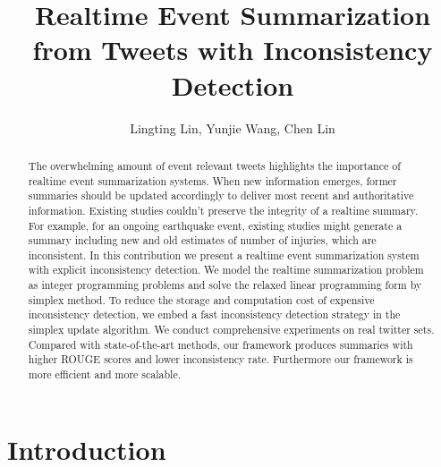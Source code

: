 \documentclass[envcountsame]{llncs}
\begin{document}
\title{Realtime Event Summarization from Tweets with Inconsistency Detection}
\author{Lingting Lin, Yunjie Wang, Chen Lin}

\maketitle
\begin{abstract}
The overwhelming amount of event relevant tweets highlights the importance of realtime event summarization systems. When new information emerges,  former summaries should be updated accordingly to deliver most recent and authoritative information. Existing studies couldn't preserve the integrity of a realtime summary.  For example, for an ongoing earthquake event, existing studies might generate a  summary including new and old estimates of number of injuries, which are inconsistent. In this contribution we present a realtime event summarization system with explicit inconsistency detection. We model the realtime summarization problem as integer programming problems and solve the relaxed linear programming form by simplex method. To reduce the storage and computation cost of expensive inconsistency detection, we embed a fast inconsistency detection strategy in the  simplex update algorithm. We conduct comprehensive experiments on real twitter sets.  Compared with state-of-the-art methods, our framework produces  summaries with higher ROUGE scores and lower  inconsistency rate. Furthermore our framework is more efficient and more scalable.
\end{abstract}

\section{Introduction}
\end{document}
